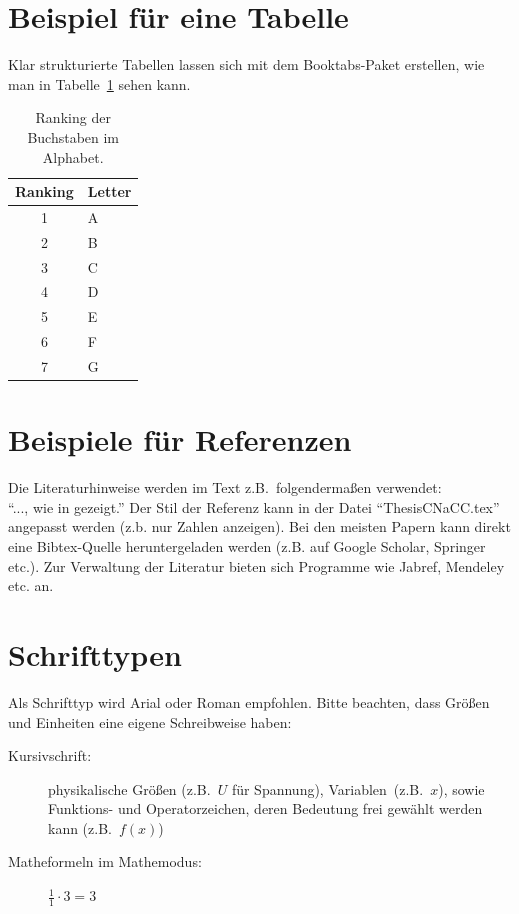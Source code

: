 \section{Beispiel für eine Tabelle}
Klar strukturierte Tabellen lassen sich mit dem Booktabs-Paket erstellen, wie man in Tabelle~\ref{table:ranking} sehen kann.

\begin{table}
	\begin{center}
		\begin{tabular}{cl}
			\toprule
			\textbf{Ranking} & \textbf{Letter} \\
			\midrule
			1 	& A \\
			2 	& B\\
			3	& C\\
			4	& D\\
			5	& E\\
			6	& F\\
			7	& G\\
			\bottomrule
		\end{tabular}
		\caption{Ranking der Buchstaben im Alphabet.}
		\label{table:ranking}
	\end{center}
\end{table}




\section{Beispiele für Referenzen}
Die Literaturhinweise werden im Text z.B.\ folgendermaßen verwendet:\\
``..., wie in \cite{architecturemobilep2p} gezeigt.'' Der Stil der Referenz kann in der Datei ``ThesisCNaCC.tex'' angepasst werden (z.b. nur Zahlen anzeigen). Bei den meisten Papern kann direkt eine Bibtex-Quelle heruntergeladen werden (z.B. auf Google Scholar, Springer etc.). Zur Verwaltung der Literatur bieten sich Programme wie Jabref, Mendeley etc. an.

\section{Schrifttypen}
Als Schrifttyp wird Arial oder Roman empfohlen. Bitte beachten, dass
Größen und Einheiten eine eigene Schreibweise haben:
\begin{description}
	\item[Kursivschrift:] physikalische Größen (z.B.~$U$ für Spannung),
	Variablen~(z.B.~$x$), sowie Funktions- und Operatorzeichen, deren
	Bedeutung frei gewählt werden kann (z.B.~$f(x)$)
	\item[Matheformeln im Mathemodus:] $\frac{1}{1} \cdot 3 = 3$
\end{description} 

